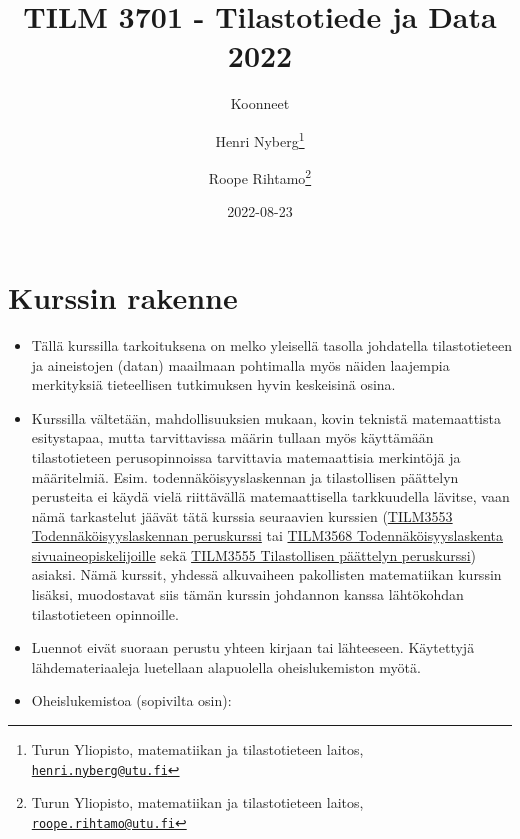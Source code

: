 \documentclass[
]{book}
\title{TILM 3701 - Tilastotiede ja Data 2022}
\author{Koonneet \and Henri Nyberg\footnote{Turun Yliopisto, matematiikan ja tilastotieteen laitos, \href{mailto:henri.nyberg@utu.fi}{\nolinkurl{henri.nyberg@utu.fi}}} \and Roope Rihtamo\footnote{Turun Yliopisto, matematiikan ja tilastotieteen laitos, \href{mailto:roope.rihtamo@utu.fi}{\nolinkurl{roope.rihtamo@utu.fi}}}}
\date{2022-08-23}
\begin{document}
\maketitle

{
\setcounter{tocdepth}{1}
\tableofcontents
}
\hypertarget{kurssin-rakenne}{%
\chapter*{Kurssin rakenne}\label{kurssin-rakenne}}

\begin{itemize}
\item
  Tällä kurssilla tarkoituksena on melko yleisellä tasolla johdatella tilastotieteen ja aineistojen (datan) maailmaan pohtimalla myös näiden laajempia merkityksiä tieteellisen tutkimuksen hyvin keskeisinä osina.
\item
  Kurssilla vältetään, mahdollisuuksien mukaan, kovin teknistä matemaattista esitystapaa, mutta tarvittavissa määrin tullaan myös käyttämään tilastotieteen perusopinnoissa tarvittavia matemaattisia merkintöjä ja määritelmiä. Esim. todennäköisyyslaskennan ja tilastollisen päättelyn perusteita ei käydä vielä riittävällä matemaattisella tarkkuudella lävitse, vaan nämä tarkastelut jäävät tätä kurssia seuraavien kurssien (\href{https://opas.peppi.utu.fi/fi/opintojakso/TILM3553/1734?period=2022-2024}{TILM3553 Todennäköisyyslaskennan peruskurssi} tai \href{https://opas.peppi.utu.fi/fi/opintojakso/TILM3568/3385?period=2022-2024}{TILM3568 Todennäköisyyslaskenta sivuaineopiskelijoille} sekä \href{https://opas.peppi.utu.fi/fi/opintojakso/TILM3555/1731?period=2022-2024}{TILM3555 Tilastollisen päättelyn peruskurssi}) asiaksi. Nämä kurssit, yhdessä alkuvaiheen pakollisten matematiikan kurssin lisäksi, muodostavat siis tämän kurssin johdannon kanssa lähtökohdan tilastotieteen opinnoille.
\item
  Luennot eivät suoraan perustu yhteen kirjaan tai lähteeseen. Käytettyjä lähdemateriaaleja luetellaan alapuolella oheislukemiston myötä.
\item
  Oheislukemistoa (sopivilta osin):


\end{itemize}
\end{document}
